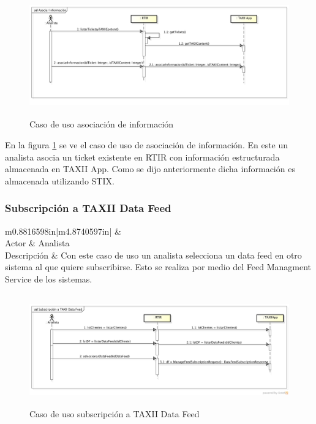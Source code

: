 \begin{figure}
	\centering
	\includegraphics[width=5.7638in,height=2.0701in]{Analisis22-img/AsociacionInformacion.png} 
	\caption{Caso de uso asociación de información}
	\label{fig.asocinfortir}
\end{figure}
\bigskip
	En la figura \ref{fig.asocinfortir} se ve el caso de uso de asociación de información. En este un analista asocia un ticket existente en RTIR con información estructurada almacenada en TAXII App. Como se dijo anteriormente dicha información es almacenada utilizando STIX.

\newpage
\subsubsection{Subscripción a TAXII Data Feed}
\begin{flushleft}
	\tablefirsthead{}
	\tablehead{}
	\tabletail{}
	\tablelasttail{}
	\begin{supertabular}{m{0.8816598in}|m{4.8740597in}|}
		 &
		\\\hline
		{Actor} &
		{Analista}\\
		{Descripción} &
		{Con este caso de uso un analista selecciona un data feed en otro sistema al que
			quiere subscribirse. Esto se realiza por medio del Feed Managment Service de los sistemas.}\\\hhline{~-}
	\end{supertabular}
\end{flushleft}

\bigskip
\begin{figure}[ht!]
	\centering
	\includegraphics[width=5.4217in,height=1.8965in]{Analisis22-img/Analisis22-img027.png}
	\caption{Caso de uso subscripción a TAXII Data Feed}
	\label{fig.subscripciontaxiidatafeed}

\end{figure}

